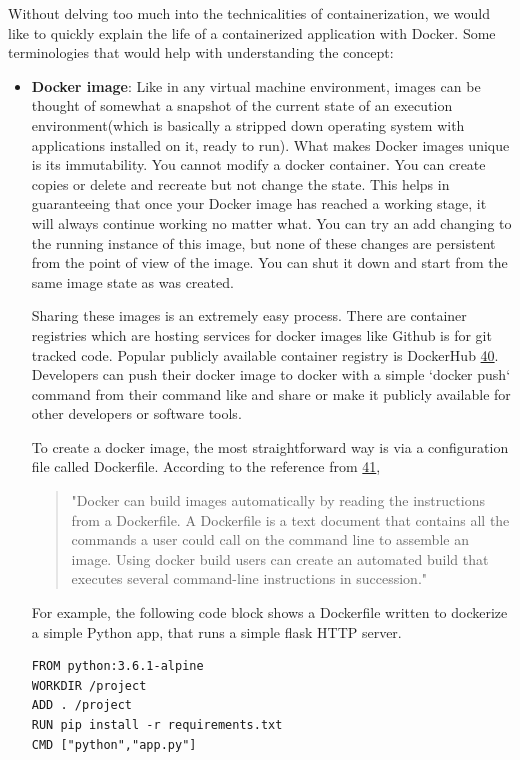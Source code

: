 \documentclass[12pt,titlepage]{article}
\begin{document}
Without delving too much into the technicalities of containerization, we would
like to quickly explain the life of a containerized application with Docker.
Some terminologies that would help with understanding the concept:
\begin{itemize}
\item \textbf{Docker image}: Like in any virtual machine environment, images can be thought of somewhat a
snapshot of the current state of an execution environment(which is basically a
stripped down operating system with applications installed on it, ready to run).
What makes Docker images unique is its immutability. You cannot modify a docker
container. You can create copies or delete and recreate but not change the
state. This helps in guaranteeing that once your Docker image has reached a
working stage, it will always continue working no matter what. You can try an
add changing to the running instance of this image, but none of these changes
are persistent from the point of view of the image. You can shut it down and
start from the same image state as was created.

Sharing these images is an extremely easy process. There are container
registries which are hosting services for docker images like Github is for git
tracked code. Popular publicly available container registry is DockerHub \hyperref[ref:40]{40}.
Developers can push their docker image to docker with a simple
`docker push` command from their command like and share or make it publicly
available for other developers or software tools.

To create a docker image, the most straightforward way is via a configuration
file called Dockerfile. According to the reference from \hyperref[ref:41]{41},

\begin{quote}

"Docker can build images automatically by reading the instructions from a
Dockerfile. A Dockerfile is a text document that contains all the commands a
user could call on the command line to assemble an image. Using docker build
users can create an automated build that executes several command-line
instructions in succession."
\end{quote}

For example, the following code block shows a Dockerfile written to dockerize a
simple Python app, that runs a simple flask HTTP server.

\begin{lstlisting}
FROM python:3.6.1-alpine
WORKDIR /project
ADD . /project
RUN pip install -r requirements.txt
CMD ["python","app.py"]
\end{lstlisting}


\end{itemize}
\end{document}
